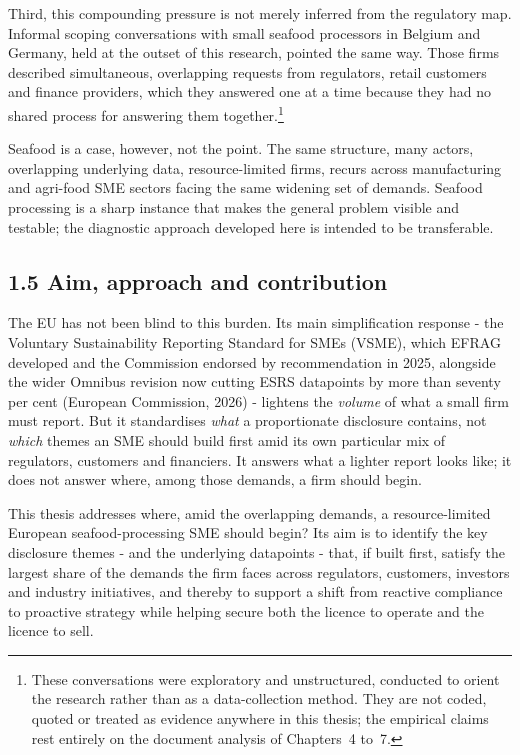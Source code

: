 Third, this compounding pressure is not merely inferred from the regulatory map.
Informal scoping conversations with small seafood processors in Belgium and
Germany, held at the outset of this research, pointed the same way. Those firms
described simultaneous, overlapping requests from regulators, retail customers
and finance providers, which they answered one at a time because they had no
shared process for answering them together.\footnote{These conversations were
exploratory and unstructured, conducted to orient the research rather than as a
data-collection method. They are not coded, quoted or treated as evidence
anywhere in this thesis; the empirical claims rest entirely on the document
analysis of Chapters~4 to~7.}

Seafood is a case, however, not the point. The same structure, many actors,
overlapping underlying data, resource-limited firms, recurs across
manufacturing and agri-food SME sectors facing the same widening set of
demands. Seafood processing is a sharp instance that makes the general
problem visible and testable; the diagnostic approach developed here is
intended to be transferable.

\subsection{1.5 Aim, approach and
contribution}\label{aim-approach-and-contribution}

The EU has not been blind to this burden. Its main simplification response -
the Voluntary Sustainability Reporting Standard for SMEs (VSME), which EFRAG
developed and the Commission endorsed by recommendation in 2025, alongside the
wider Omnibus revision now cutting ESRS datapoints by more than seventy per cent
(European Commission, 2026) - lightens the \emph{volume} of what a small firm
must report. But it standardises \emph{what} a proportionate disclosure
contains, not \emph{which} themes an SME should build first amid its own
particular mix of regulators, customers and financiers. It answers what a
lighter report looks like; it does not answer where, among those demands, a
firm should begin.

This thesis addresses where, amid the overlapping demands, a resource-limited European seafood-processing SME should
begin? Its aim is to identify the key disclosure themes - and the underlying
datapoints - that, if built first, satisfy the largest share of the demands
the firm faces across regulators, customers, investors and industry initiatives,
and thereby to support a shift from reactive compliance to proactive strategy
while helping secure both the licence to operate and the licence to sell.

